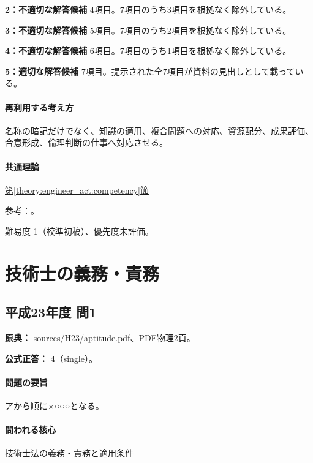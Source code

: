 \noindent\textbf{2：不適切な解答候補} 4項目。7項目のうち3項目を根拠なく除外している。\par

\noindent\textbf{3：不適切な解答候補} 5項目。7項目のうち2項目を根拠なく除外している。\par

\noindent\textbf{4：不適切な解答候補} 6項目。7項目のうち1項目を根拠なく除外している。\par

\noindent\textbf{5：適切な解答候補} 7項目。提示された全7項目が資料の見出しとして載っている。\par

\paragraph{再利用する考え方} 名称の暗記だけでなく、知識の適用、複合問題への対応、資源配分、成果評価、合意形成、倫理判断の仕事へ対応させる。

\paragraph{共通理論} \hyperref[theory:engineer_act:competency]{第\ref*{theory:engineer_act:competency}節}

\par 参考：\cite{mext_competency2014}。

\par 難易度 1（校準初稿）、優先度未評価。

\section{技術士の義務・責務}

\subsection{平成23年度 問1}
\label{q:h23-reg-apt-01}

\noindent\textbf{原典：} sources/H23/aptitude.pdf、PDF物理2頁。

\textbf{公式正答：} 4（single）。

\paragraph{問題の要旨} アから順に×○○○となる。

\paragraph{問われる核心} 技術士法の義務・責務と適用条件

